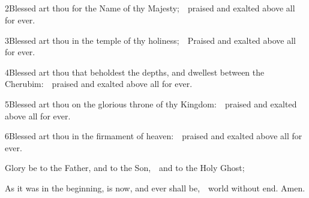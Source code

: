 \medskip


{\centering\footnotesize{\par}}





\subsection{}

2\enspace Blessed art thou for the Name of thy Majesty;\ \star\ praised and exalted above all for ever.

3\enspace Blessed art thou in the temple of thy holiness;\ \star\ Praised and exalted above all for ever.

4\enspace Blessed art thou that beholdest the depths, and dwellest between the Cherubim:\ \star\ praised and exalted above all for ever.

5\enspace Blessed art thou on the glorious throne of thy Kingdom:\ \star\ praised and exalted above all for ever.

6\enspace Blessed art thou in the firmament of heaven:\ \star\ praised and exalted above all for ever.

Glory be to the Father, and to the Son,\ \star\ and to the Holy Ghost;

As it was in the beginning, is now, and ever shall be,\ \star\ world without end. Amen.

\subsubsection{}


